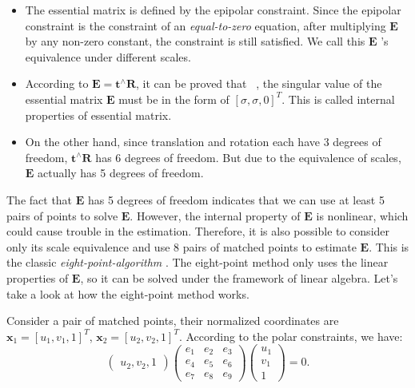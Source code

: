 \begin{itemize}
	\item The essential matrix is defined by the epipolar constraint. Since the epipolar constraint is the constraint of an\textit{ equal-to-zero }equation, after multiplying $\mathbf{E}$ by any non-zero constant, the constraint is still satisfied. We call this $\mathbf{E}$ 's equivalence under different scales.
	\item According to $\mathbf{E} = \mathbf{t}^ \wedge \mathbf{R}$, it can be proved that ~\cite{Hartley2003}, the singular value of the essential matrix $\mathbf{E}$ must be in the form of $[\sigma, \sigma, 0]^T$. This is called internal properties of essential matrix.
	\item On the other hand, since translation and rotation each have 3 degrees of freedom, $\mathbf{t}^\wedge \mathbf{R}$ has 6 degrees of freedom. But due to the equivalence of scales, $\mathbf{E}$ actually has 5 degrees of freedom.
\end{itemize}

The fact that $\mathbf{E}$ has 5 degrees of freedom indicates that we can use at least 5 pairs of points to solve $\mathbf{E}$. However, the internal property of $\mathbf{E}$ is nonlinear, which could cause trouble in the estimation. Therefore, it is also possible to consider only its scale equivalence and use 8 pairs of matched points to estimate $\mathbf{E}$. This is the classic \textit{eight-point-algorithm} {\cite{Hartley1997, Longuet-Higgins1987}}. The eight-point method only uses the linear properties of $\mathbf{E}$, so it can be solved under the framework of linear algebra. Let's take a look at how the eight-point method works.

Consider a pair of matched points, their normalized coordinates are $\mathbf{x}_{1}=[u_{1},v_{1},1]^T$, $\mathbf{x}_{2}=[u_{2},v_{2},1]^T$. According to the polar constraints, we have:
\begin{equation}
\begin{pmatrix} 
u_{2},v_{2},1
\end{pmatrix}
\begin{pmatrix}
 e_{1} & e_{2} & e_{3}\\ 
 e_{4} & e_{5} & e_{6}\\ 
 e_{7} & e_{8} & e_{9} 
\end{pmatrix}
\begin{pmatrix} 
u_{1}\\v_{1}\\1
\end{pmatrix}
=0.
\end{equation}

